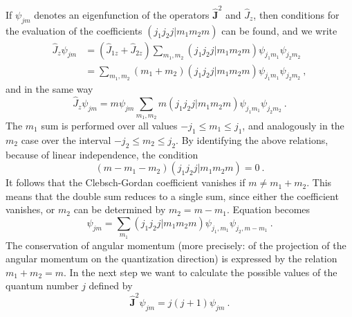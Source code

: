\documentclass[12pt,a4paper]{article}
\renewcommand{\vec}[1]{\boldsymbol{#1}}
\begin{document}
If $\psi_{j m}$ denotes an eigenfunction of the operators $\vec{\hat{J}}^2$ and $\hat{J}_z$, then conditions for the evaluation of the coefficients $(j_1 j_2 j | m_1 m_2 m)$ can be found, and we write
\begin{align*}
\hat{J}_z \psi_{j m} &= (\hat{J}_{1z} + \hat{J}_{2z}) \sum_{m_1, m_2} (j_1 j_2 j | m_1 m_2 m) \psi_{j_1 m_1} \psi_{j_2 m_2} \\
&= \sum_{m_1, m_2} (m_1 +  m_2 ) (j_1 j_2 j | m_1 m_2 m) \psi_{j_1 m_1} \psi_{j_2 m_2}  ~,
\end{align*}
and in the same way
\begin{equation}
\hat{J}_z \psi_{j m} = m \psi_{j m} \sum_{m_1, m_2} m (j_1 j_2 j | m_1 m_2 m) \psi_{j_1 m_1} \psi_{j_2 m_2} ~.
\end{equation}
The $m_1$ sum is performed over all values $- j_1 \leqslant m_1 \leqslant  j_1$, and analogously in the $m_2$ case over the interval $- j_2 \leqslant m_2 \leqslant  j_2$. By identifying the above relations, because of linear independence, the condition
\begin{equation}
(m-m_1 -m_2)( j_1 j_2 j|m_1 m_2 m ) = 0 ~.
\end{equation}
It follows that the Clebsch-Gordan coefficient vanishes if $m \neq m_1 + m_2$. This means that the double sum reduces to a single sum, since either the coefficient vanishes, or $m_2$ can be determined by $m_2 = m - m_1$. Equation becomes
\begin{equation}
 \psi_{j m} = \sum_{m_1} ( j_1 j_2 j|m_1 m_2 m ) \psi_{j_1, m_1} \psi_{j_2, m- m_1} ~.
\end{equation}
The conservation of angular momentum (more precisely: of the projection of the angular momentum on the quantization direction) is expressed by the relation $m_1 + m_2 = m$. In the next step we want to calculate the possible values of the quantum number $j$ defined by
\begin{equation}
\vec{\hat{J}}^2 \psi_{jm} = j(j+1)  \psi_{jm} ~.
\end{equation}
\end{document}

